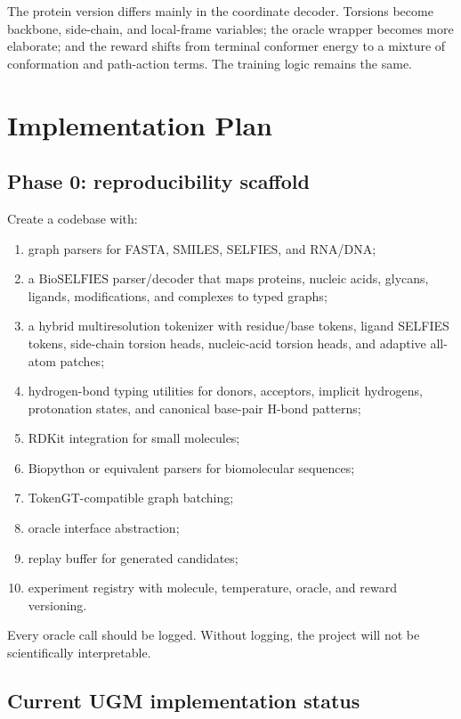 \documentclass[11pt]{article}
\newcommand{\bioselfies}{\mathrm{BioSELFIES}}
\begin{document}
The protein version differs mainly in the coordinate decoder. Torsions become backbone, side-chain, and local-frame variables; the oracle wrapper becomes more elaborate; and the reward shifts from terminal conformer energy to a mixture of conformation and path-action terms. The training logic remains the same.

\section{Implementation Plan}

\subsection{Phase 0: reproducibility scaffold}

Create a codebase with:
\begin{enumerate}[leftmargin=2em]
  \item graph parsers for FASTA, SMILES, SELFIES, and RNA/DNA;
  \item a $\bioselfies$ parser/decoder that maps proteins, nucleic acids, glycans, ligands, modifications, and complexes to typed graphs;
  \item a hybrid multiresolution tokenizer with residue/base tokens, ligand SELFIES tokens, side-chain torsion heads, nucleic-acid torsion heads, and adaptive all-atom patches;
  \item hydrogen-bond typing utilities for donors, acceptors, implicit hydrogens, protonation states, and canonical base-pair H-bond patterns;
  \item RDKit integration for small molecules;
  \item Biopython or equivalent parsers for biomolecular sequences;
  \item TokenGT-compatible graph batching;
  \item oracle interface abstraction;
  \item replay buffer for generated candidates;
  \item experiment registry with molecule, temperature, oracle, and reward versioning.
\end{enumerate}

Every oracle call should be logged. Without logging, the project will not be scientifically interpretable.

\subsection{Current UGM implementation status}
\end{document}
